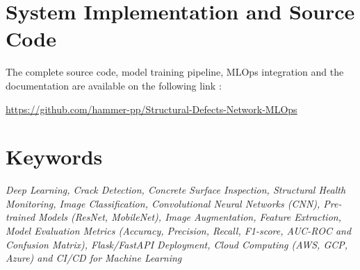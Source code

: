 \section{System Implementation and Source Code}

The complete source code, model training pipeline, MLOps integration and the documentation are available on the following link :

\url{https://github.com/hammer-pp/Structural-Defects-Network-MLOps}  

\section{Keywords}

\textit{Deep Learning, Crack Detection, Concrete Surface Inspection, Structural Health Monitoring, Image Classification, Convolutional Neural Networks (CNN), Pre-trained Models (ResNet, MobileNet), Image Augmentation, Feature Extraction, Model Evaluation Metrics (Accuracy, Precision, Recall, F1-score, AUC-ROC and Confusion Matrix), Flask/FastAPI Deployment, Cloud Computing (AWS, GCP, Azure) and CI/CD for Machine Learning}


\clearpage